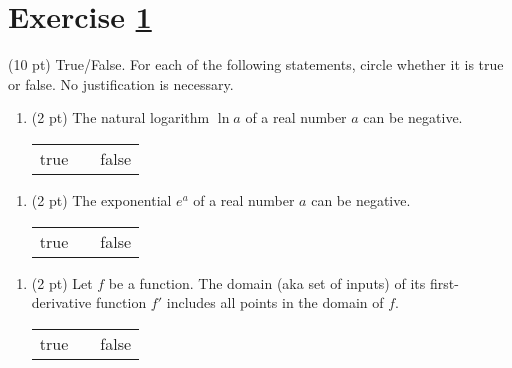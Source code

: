 %
%
%
%


\section{Exercise \ref{sec : Math112 Spring2022 MockExam1 Q1}}
\label{sec : Math112 Spring2022 MockExam1 Q1}

(10 pt) True/False. For each of the following statements, circle whether it is true or false. No justification is necessary.
\begin{enumerate}[label=(\alph*)]
\item\label{itm : ME1Q1a} (2 pt) The natural logarithm $\ln a$ of a real number $a$ can be negative.
\begin{center}
\begin{tabular}{c c c}
true	&	\hspace{1in}	&	false
\end{tabular}
\end{center}
\end{enumerate}


\begin{enumerate}[resume,label=(\alph*)]
\item\label{itm : ME1Q1b} (2 pt) The exponential $e^{a}$ of a real number $a$ can be negative.
\begin{center}
\begin{tabular}{c c c}
true	&	\hspace{1in}	&	false
\end{tabular}
\end{center}
\end{enumerate}


\begin{enumerate}[resume,label=(\alph*)]
\item\label{itm : ME1Q1c} (2 pt) Let $f$ be a function. The domain (aka set of inputs) of its first-derivative function $f'$ includes all points in the domain of $f$.
\begin{center}
\begin{tabular}{c c c}
true	&	\hspace{1in}	&	false
\end{tabular}
\end{center}
\end{enumerate}

